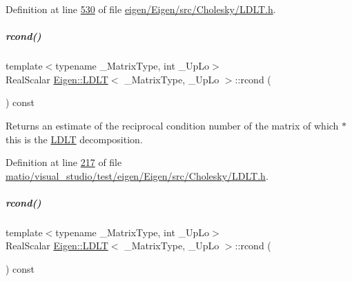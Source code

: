 Definition at line \hyperlink{eigen_2_eigen_2src_2_cholesky_2_l_d_l_t_8h_source_l00530}{530} of file \hyperlink{eigen_2_eigen_2src_2_cholesky_2_l_d_l_t_8h_source}{eigen/\+Eigen/src/\+Cholesky/\+L\+D\+L\+T.\+h}.

\mbox{\label{group___cholesky___module_ae646403fdde3a4b18e278a32c61a0953}} 
\subparagraph{\texorpdfstring{rcond()}{rcond()}\hspace{0.1cm}{\footnotesize\ttfamily [1/2]}}
{\footnotesize\ttfamily template$<$typename \+\_\+\+Matrix\+Type, int \+\_\+\+Up\+Lo$>$ \\
Real\+Scalar \hyperlink{group___cholesky___module_class_eigen_1_1_l_d_l_t}{Eigen\+::\+L\+D\+LT}$<$ \+\_\+\+Matrix\+Type, \+\_\+\+Up\+Lo $>$\+::rcond (\begin{DoxyParamCaption}{ }\end{DoxyParamCaption}) const\hspace{0.3cm}{\ttfamily [inline]}}

\begin{DoxyReturn}{Returns}
an estimate of the reciprocal condition number of the matrix of which {\ttfamily $\ast$this} is the \hyperlink{group___cholesky___module_class_eigen_1_1_l_d_l_t}{L\+D\+LT} decomposition. 
\end{DoxyReturn}


Definition at line \hyperlink{matio_2visual__studio_2test_2eigen_2_eigen_2src_2_cholesky_2_l_d_l_t_8h_source_l00217}{217} of file \hyperlink{matio_2visual__studio_2test_2eigen_2_eigen_2src_2_cholesky_2_l_d_l_t_8h_source}{matio/visual\+\_\+studio/test/eigen/\+Eigen/src/\+Cholesky/\+L\+D\+L\+T.\+h}.

\mbox{\label{group___cholesky___module_ae646403fdde3a4b18e278a32c61a0953}} 
\subparagraph{\texorpdfstring{rcond()}{rcond()}\hspace{0.1cm}{\footnotesize\ttfamily [2/2]}}
{\footnotesize\ttfamily template$<$typename \+\_\+\+Matrix\+Type, int \+\_\+\+Up\+Lo$>$ \\
Real\+Scalar \hyperlink{group___cholesky___module_class_eigen_1_1_l_d_l_t}{Eigen\+::\+L\+D\+LT}$<$ \+\_\+\+Matrix\+Type, \+\_\+\+Up\+Lo $>$\+::rcond (\begin{DoxyParamCaption}{ }\end{DoxyParamCaption}) const\hspace{0.3cm}{\ttfamily [inline]}}

